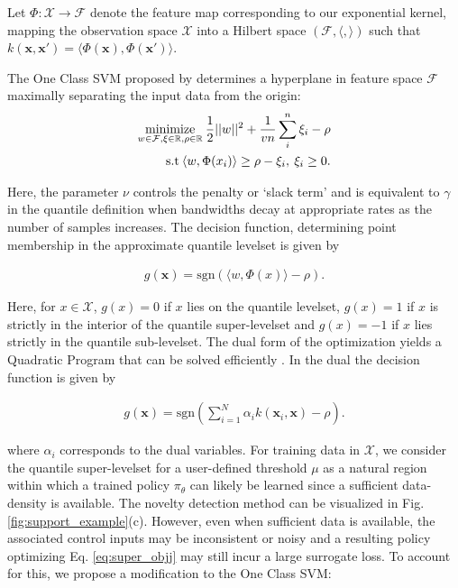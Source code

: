 \documentclass[10pt, conference]{ieeeconf}      %
\newcommand{\bx}{\mathbf{x}}
\begin{document}
Let $\Phi:\mathcal{X}\to \mathcal{F}$ denote the feature map corresponding to our exponential kernel, mapping the
observation space $\mathcal{X}$ into a Hilbert space $(\mathcal{F}, \langle, \rangle)$ such that $k(\bx, \bx') = \langle
\Phi(\bx), \Phi(\bx')\rangle$.

The One Class SVM proposed by \cite{scholkopf2001estimating} determines a hyperplane in feature space $\mathcal{F}$
maximally separating the input data from the origin:
\vspace{-2ex}
\begin{align}\label{eq:primal_sup}
    \underset{w\in \mathcal{F}, \mathbf{\xi} \in \mathbb{R}, \rho \in \mathbb{R}}{\mbox{minimize}}\: \frac{1}{2}||w||^2+\frac{1}{vn} \sum^n_i \xi_i - \rho\\
\mbox{s.t} \: \langle w,\Phi(x_i) \rangle \geq \rho - \xi_i, \: \xi_i \geq 0 \notag.
\end{align}

Here, the parameter $\nu$ controls the penalty or `slack term' and is equivalent to $\gamma$ \cite{vert2006consistency}
in the quantile definition when bandwidths decay at appropriate rates as the number of samples increases. The decision
function, determining point membership in the approximate quantile levelset is given by

\vspace{-2ex}
\begin{align}\label{eq:decision_func}
g(\bx) = \mbox{sgn}(\langle w,\Phi(x) \rangle-\rho).
\end{align}


Here, for $x\in \mathcal{X}$, $g(x)=0$ if $x$ lies on the quantile levelset,
$g(x) = 1$ if $x$ is strictly in the interior of the quantile super-levelset and $g(x) = -1$ 
if $x$ lies strictly in the quantile sub-levelset. The dual form of the optimization yields a Quadratic Program 
that can be solved efficiently \cite{scholkopf2001estimating}. In the dual the decision function is given by 

\vspace{-2ex}
\begin{align}\label{eq:decision_func}
g(\bx) = \mbox{sgn}(\sum^N_{i=1}\alpha_i k(\bx_i,\bx)-\rho).
\end{align}

where $\alpha_i$ corresponds to the dual variables.    For training data in $\mathcal{X}$, we consider the quantile super-levelset for a user-defined threshold $\mu$ as a natural region within which
a trained policy $\pi_{\theta}$ can likely be learned since a sufficient data-density is available. The novelty detection method can be visualized in Fig. \ref{fig:support_example}(c). 
However, even when sufficient data is available, the associated control inputs may be inconsistent or noisy and a resulting policy
optimizing Eq. \ref{eq:super_objj} may still incur a large surrogate loss. To account for this, we propose a
modification to the One Class SVM:
\end{document}
